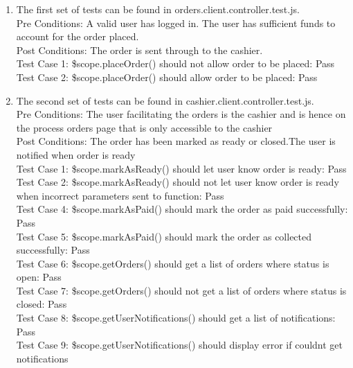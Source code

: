 \documentclass[a4paper,12pt]{report}
\begin{document}
\begin{enumerate}

\item The first set of tests can be found in orders.client.controller.test.js.\\
Pre Conditions: A valid user has logged in. The user has sufficient funds to account for the order placed.\\
Post Conditions: The order is sent through to the cashier. \\
Test Case 1: \$scope.placeOrder() should not allow order to be placed: Pass\\
Test Case 2: \$scope.placeOrder() should allow order to be placed: Pass\\

\item The second set of tests can be found in cashier.client.controller.test.js.\\
Pre Conditions: The user facilitating the orders is the cashier and is hence on the process orders page that is only accessible to the cashier\\
Post Conditions: The order has been marked as ready or closed.The user is notified when order is ready\\
Test Case 1: \$scope.markAsReady() should let user know order is ready: Pass\\
Test Case 2: \$scope.markAsReady() should not let user know order is ready when incorrect parameters sent to function: Pass \\
Test Case 4: \$scope.markAsPaid() should  mark the order as paid successfully: Pass \\
Test Case 5: \$scope.markAsPaid() should  mark the order as collected successfully: Pass \\
Test Case 6: \$scope.getOrders() should get a list of orders where status is open: Pass \\
Test Case 7: \$scope.getOrders() should not get a list of orders where status is closed: Pass \\
Test Case 8: \$scope.getUserNotifications() should get a list of notifications: Pass \\
Test Case 9: \$scope.getUserNotifications() should display error if couldnt get notifications \\


\end{enumerate}
\end{document}
